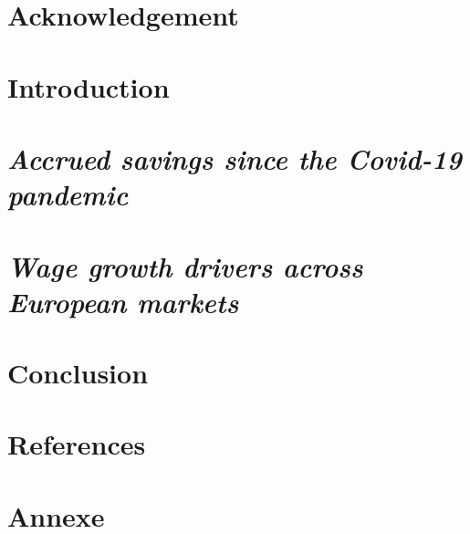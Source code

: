 \documentclass[15pt, english]{article}
\begin{document}

\newpage


\pagestyle{fancy}
\fancyhead[L]{}
\fancyhead[R]{}
\thispagestyle{empty}
\tableofcontents
\break
\setcounter{page}{1}
\section*{Acknowledgement}

\newpage
{}
\section*{Introduction}

\newpage

\pagestyle{fancy}
\fancyhead[L]{\leftmark}
\fancyhead[R]{}

\section{\textit{Accrued savings since the Covid-19 pandemic}}

\newpage

\section{\textit{Wage growth drivers across European markets}}

\newpage

\section*{Conclusion}

\newpage

\pagestyle{fancy}
\fancyhead[L]{}
\fancyhead[R]{}
\section*{References}
\printbibliography

\section*{Annexe}


\pagestyle{empty}

\newpage

\newpage

%
\end{document}
